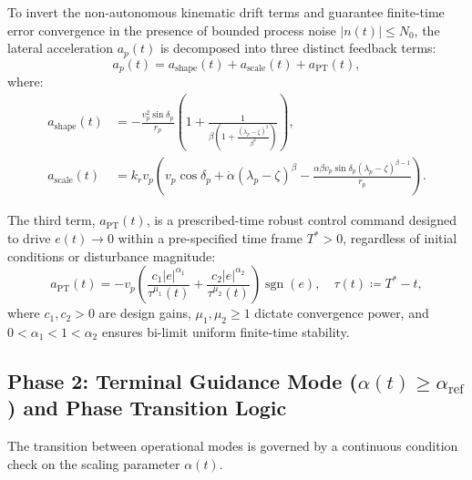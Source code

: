 To invert the non-autonomous kinematic drift terms and guarantee finite-time error convergence in the presence of bounded process noise $|n(t)| \le N_0$, the lateral acceleration $a_p(t)$ is decomposed into three distinct feedback terms:
\begin{equation}\label{eq:ch_sp_ap_phase1}
	a_p(t) = a_{\text{shape}}(t) + a_{\text{scale}}(t) + a_{\text{PT}}(t),
\end{equation}
where:
\begin{align}
	a_{\text{shape}}(t) &= -\frac{v_p^2 \sin \delta_p}{r_p} \left( 1 + \frac{1}{\beta \left( 1 + \frac{(\lambda_p - \zeta)^2}{\beta^2} \right)} \right), \label{eq:ch_sp_ashape} \\
	a_{\text{scale}}(t) &= k_r v_p \left( v_p \cos \delta_p + \dot{\alpha} (\lambda_p - \zeta)^\beta - \frac{\alpha \beta v_p \sin \delta_p (\lambda_p - \zeta)^{\beta-1}}{r_p} \right). \label{eq:ch_sp_ascale}
\end{align}

The third term, $a_{\text{PT}}(t)$, is a prescribed-time robust control command designed to drive $e(t) \to 0$ within a pre-specified time frame $T^* > 0$, regardless of initial conditions or disturbance magnitude:
\begin{equation}\label{eq:ch_sp_aPT}
	a_{\text{PT}}(t) = -v_p \left( \frac{c_1 |e|^{\alpha_1}}{\tau^{\mu_1}(t)} + \frac{c_2 |e|^{\alpha_2}}{\tau^{\mu_2}(t)} \right) \operatorname{sgn}(e), \quad \tau(t) \coloneqq T^* - t,
\end{equation}
where $c_1, c_2 > 0$ are design gains, $\mu_1, \mu_2 \ge 1$ dictate convergence power, and $0 < \alpha_1 < 1 < \alpha_2$ ensures bi-limit uniform finite-time stability.
\subsection{Phase 2: Terminal Guidance Mode ($\alpha(t) \ge \alpha_{\text{ref}}$) and Phase Transition Logic}\label{subsec:ch_sp_phase2}
The transition between operational modes is governed by a continuous condition check on the scaling parameter $\alpha(t)$.

